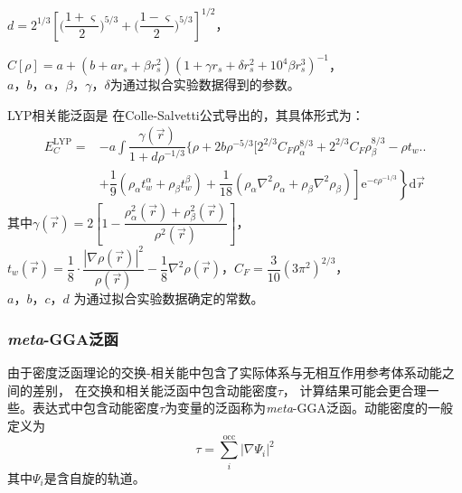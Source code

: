 $d=2^{1/3}\left[\biggl(\dfrac {1+\varsigma}2\biggr)^{5/3}+\biggl(\dfrac{1-\varsigma}2\biggr)^{5/3}\right]^{1/2}$，

$C[\rho]=a+(b+ar_s+\beta r_s^2)(1+\gamma r_s+\delta r_s^2+10^4\beta r_s^3)^{-1}$，\\%
$a$，$b$，$\alpha$，$\beta$，$\gamma$，$\delta$为通过拟合{实验数据}得到的参数。

LYP相关能泛函是%
{在}Colle-Salvetti公式导出的，其具体形式为：
\begin{equation}
  \begin{aligned}
	  E_C^{\mathrm{LYP}}=&-a\int\dfrac{\gamma(\vec r)}{1+d\rho^{-1/3}}\biggl\{\rho+2b\rho^{-5/3}\biggl[2^{2/3}C_F\rho_{\alpha}^{8/3}+2^{2/3}C_F\rho_{\beta}^{8/3}-\rho t_w\biggr.\biggr.\\
  &+\left.\left.\dfrac19\left(\rho_{\alpha}t_w^{\alpha}+\rho_{\beta}t_w^{\beta}\right)+\dfrac1{18}\left(\rho_{\alpha}\nabla^2\rho_{\alpha}+\rho_{\beta}\nabla^2\rho_{\beta}\right)\right]\textrm{e}^{-c\rho^{-1/3}}\right\}\textrm{d}\vec r
  \end{aligned}
  \label{eq:dft-20}
\end{equation}
其中$\gamma(\vec r)=2\left[1-\dfrac{\rho_{\alpha}^2(\vec r)+\rho_{\beta}^2(\vec r)}{\rho^2(\vec r)}\right]$，$t_w(\vec r)=\dfrac18\cdot\dfrac{|\nabla\rho(\vec r)|^2}{\rho(\vec r)}-\dfrac18\nabla^2\rho(\vec r)$，$C_F=\dfrac3{10}(3\pi^2)^{2/3}$，\\$a$，$b$，$c$，$d$%
{为通过拟合实验数据确定的}常数。

\subsubsection{\textit{meta}-GGA泛函}
由于密度泛函理论的交换-相关能中包含了实际体系与无相互作用参考体系动能{之}间的差别，%
在交换和相关能泛函中包含动能密度$\tau$，%
计算结果可能会更合理一些。表达式中包含动能密度$\tau$为变量的泛函称为\textit{meta}-GGA泛函。动能密度的一般定义为
\begin{equation}
	\tau=\sum_i^{\mathrm{occ}}|\nabla\Psi_i|^2
  \label{eq:dft-21}
\end{equation}
其中$\Psi_i$是含自旋的轨道。

